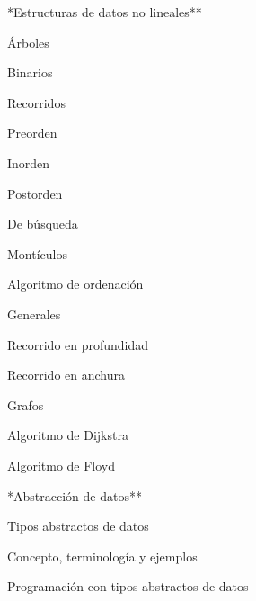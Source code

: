\begin{longenum}
\begin{longenum}
    \end{longenum}
    \item **Estructuras de datos no lineales**
    \begin{longenum}
        \item Árboles
        \begin{longenum}
            \item Binarios
            \begin{longenum}
                \item Recorridos
                \begin{longenum}
                    \item Preorden
                    \item Inorden
                    \item Postorden
                \end{longenum}
            \end{longenum}
            \item De búsqueda
            \item Montículos
            \begin{longenum}
                \item Algoritmo de ordenación
            \end{longenum}
            \item Generales
            \begin{longenum}
                \item Recorrido en profundidad
                \item Recorrido en anchura
            \end{longenum}
        \end{longenum}
        \item Grafos
        \begin{longenum}
            \item Algoritmo de Dijkstra
            \item Algoritmo de Floyd
        \end{longenum}
    \end{longenum}
    \item **Abstracción de datos**
    \begin{longenum}
        \item Tipos abstractos de datos
        \begin{longenum}
            \item Concepto, terminología y ejemplos
            \item Programación con tipos abstractos de datos

\end{longenum}
\end{longenum}
\end{longenum}
